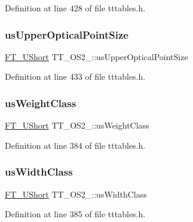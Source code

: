 Definition at line 428 of file tttables.\+h.

\mbox{\label{struct_t_t___o_s2___a8b068c0e31e8c8de527f010b9860d2ae}} 
\subsubsection{\texorpdfstring{usUpperOpticalPointSize}{usUpperOpticalPointSize}}
{\footnotesize\ttfamily \mbox{\hyperlink{fttypes_8h_a937f6c17cf5ffd09086d8610c37b9f58}{F\+T\+\_\+\+U\+Short}} T\+T\+\_\+\+O\+S2\+\_\+\+::us\+Upper\+Optical\+Point\+Size}



Definition at line 433 of file tttables.\+h.

\mbox{\label{struct_t_t___o_s2___af4d8ab32a27382ea95b882d9e2615ec9}} 
\subsubsection{\texorpdfstring{usWeightClass}{usWeightClass}}
{\footnotesize\ttfamily \mbox{\hyperlink{fttypes_8h_a937f6c17cf5ffd09086d8610c37b9f58}{F\+T\+\_\+\+U\+Short}} T\+T\+\_\+\+O\+S2\+\_\+\+::us\+Weight\+Class}



Definition at line 384 of file tttables.\+h.

\mbox{\label{struct_t_t___o_s2___a8ef38b9f9c65a65aa6abf92e19236146}} 
\subsubsection{\texorpdfstring{usWidthClass}{usWidthClass}}
{\footnotesize\ttfamily \mbox{\hyperlink{fttypes_8h_a937f6c17cf5ffd09086d8610c37b9f58}{F\+T\+\_\+\+U\+Short}} T\+T\+\_\+\+O\+S2\+\_\+\+::us\+Width\+Class}



Definition at line 385 of file tttables.\+h.

\mbox{\label{struct_t_t___o_s2___aeb85b76e77753e4b59945550bdd098a1}} 
